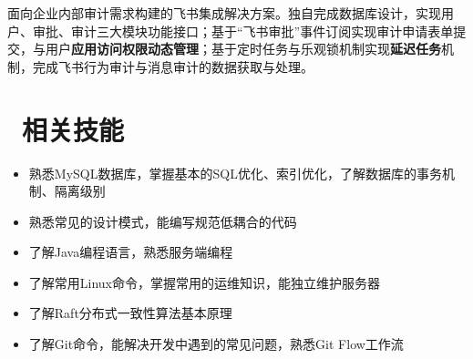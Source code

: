 \documentclass{resume}
\begin{document}
  \begin{onehalfspacing}
    面向企业内部审计需求构建的飞书集成解决方案。独自完成数据库设计，实现用户、审批、审计三大模块功能接口；基于“飞书审批”事件订阅实现审计申请表单提交，与用户\textbf{应用访问权限动态管理}；基于定时任务与乐观锁机制实现\textbf{延迟任务}机制，完成飞书行为审计与消息审计的数据获取与处理。
  \end{onehalfspacing}

\section{\faInfo\ 相关技能}
  \begin{onehalfspacing}
    \begin{itemize}
      \item 熟悉MySQL数据库，掌握基本的SQL优化、索引优化，了解数据库的事务机制、隔离级别
      \item 熟悉常见的设计模式，能编写规范低耦合的代码
      \item 了解Java编程语言，熟悉服务端编程
      \item 了解常用Linux命令，掌握常用的运维知识，能独立维护服务器
      \item 了解Raft分布式一致性算法基本原理
      \item 了解Git命令，能解决开发中遇到的常见问题，熟悉Git Flow工作流
    \end{itemize}
  \end{onehalfspacing}
\end{document}
